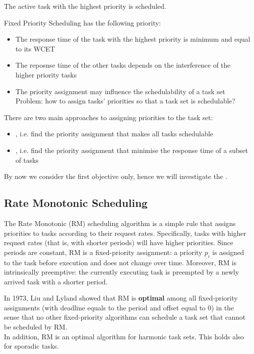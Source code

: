 The active task with the highest priority is scheduled.

Fixed Priority Scheduling has the following priority:
\begin{itemize}
    \item The response time of the task with the highest priority is minimum and equal to its WCET
    \item The reposnse time of the other tasks depends on the interference of the higher priority tasks
    \item The priority assignment may influence the schedulability of a task set\\
    Problem: how to assign tasks' priorities so that a task set is schedulable?
\end{itemize}

There are two main approaches to assigning priorities to the task set:
\begin{itemize}
\item {}, i.e. find the priority assignment that makes all tasks schedulable
\item {}, i.e. find the priority assignment that minimise the response time of a subset of tasks
\end{itemize}
By now we consider the first objective only, hence we will investigate the .

\subsection{Rate Monotonic Scheduling}
The Rate Monotonic (RM) scheduling algorithm is a simple rule that assigns priorities to tasks according to their request rates. Specifically, tasks with higher request rates (that is, with shorter periods) will have higher priorities. Since periods are constant, RM is a fixed-priority assignment: a priority $p_i$ is assigned to the task before execution and does not change over time. Moreover, RM is intrinsically preemptive: the currently executing task is preempted by a newly arrived task with a shorter period.

In 1973, Liu and Lyland showed that RM is \textbf{optimal} among all fixed-priority assignments (with deadline equals to the period and offset equal to 0) in the sense that no other fixed-priority algorithms can schedule a task set that cannot be scheduled by RM.\\
In addition, RM is an optimal algorithm for harmonic task sets.
This holds also for sporadic tasks.


